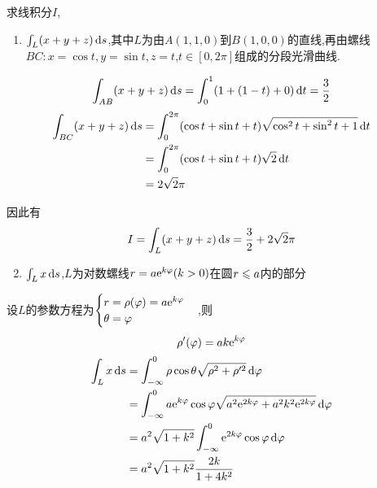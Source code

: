 \begin{example}
    求线积分$I$,
    \begin{enumerate}
        \item $\int_L (x+y+z) \operatorname{d\!} s$,其中$L$为由$A(1,1,0)$到$B(1,0,0)$的直线,再由螺线$BC:x = \cos t, y = \sin t, z = t$,$t \in [0,2\pi]$组成的分段光滑曲线.
    \end{enumerate}


\begin{solution}
    $$\int_{AB} (x+y+z) \operatorname{d\!} s = \int_0^1 (1+(1-t) + 0) \operatorname{d\!} t = \frac{3}{2}$$
    \begin{align*}
    \int_{BC} (x+y+z) \operatorname{d\!} s &= \int_0^{2\pi} (\cos t + \sin t + t) \sqrt{\cos^2 t + \sin^2 t + 1} \operatorname{d\!} t\\
    &= \int_0^{2\pi} (\cos t + \sin t + t) \sqrt{2} \operatorname{d\!} t\\
    &= 2 \sqrt{2} \pi
    \end{align*}

    因此有$$I = \int_L (x+y+z) \operatorname{d\!} s = \frac{3}{2} + 2\sqrt{2} \pi$$
\end{solution}

\begin{enumerate}
    \setcounter{enumi}{1}
    \item $\int_L x \operatorname{d\!} s$,$L$为对数螺线$r = a \mathrm{e}^{k \varphi} (k > 0)$在圆$r \leqslant a$内的部分
\end{enumerate}

\begin{solution}
    设$L$的参数方程为$\begin{cases}
        r = \rho(\varphi) = a \mathrm{e}^{k \varphi}\\
        \theta = \varphi\\
    \end{cases}$,则
    $$\rho'(\varphi) = ak \mathrm{e}^{k \varphi}$$
    \begin{align*}
    \int_L x \operatorname{d\!} s &= \int_{-\infty}^0 \rho \cos \theta \sqrt{\rho^2 + \rho'^2} \operatorname{d\!} \varphi\\
    &= \int_{-\infty}^0 a \mathrm{e}^{k \varphi} \cos \varphi \sqrt{a^2 \mathrm{e}^{2k\varphi} + a^2 k^2 \mathrm{e}^{2k\varphi}} \operatorname{d\!} \varphi\\
    &= a^2 \sqrt{1+k^2} \int_{-\infty}^0 \mathrm{e}^{2k \varphi} \cos \varphi \operatorname{d\!} \varphi\\
    &= a^2 \sqrt{1+k^2} \frac{2k}{1+4k^2}
    \end{align*}
\end{solution}

\end{example}


